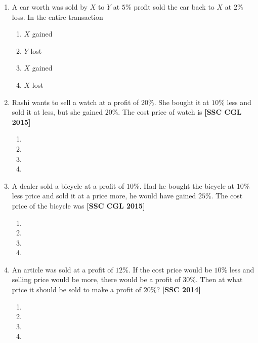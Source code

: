 \documentclass[twocolumn]{article}
\begin{document}
\begin{enumerate}
        \item A car worth  was sold by $X$ to $Y$ at $5 \%$ profit sold the car back to $X$ at $2 \%$ loss. In the entire transaction
            \begin{enumerate}
                \item $X$ gained 
                \item $Y$ lost 
                \item $X$ gained 
                \item $X$ lost 
            \end{enumerate}
            
        \item Rashi wants to sell a watch at a profit of $20 \%$. She bought it at $10 \%$ less and sold it at  less, but she gained $20 \%$. The cost price of watch is \hfill {\bf[SSC CGL 2015]}
            \begin{enumerate}
                \item {}
                \item {}
                \item {}
                \item {}
            \end{enumerate}
            
        \item A dealer sold a bicycle at a profit of $10 \%$. Had he bought the bicycle at $10 \%$ less price and sold it at a price  more, he would have gained $25 \%$. The cost price of the bicycle was \hfill {\bf[SSC CGL 2015]}
            \begin{enumerate}
                \item {}
                \item {}
                \item {}
                \item {}
            \end{enumerate}
            
        \item An article was sold at a profit of $12 \%$. If the cost price would be $10 \%$ less and selling price would be  more, there would be a profit of $30 \%$. Then at what price it should be sold to make a profit of $20 \% $? \hfill {\bf[SSC 2014]}
            \begin{enumerate}
                \item {}
                \item {}
                \item {}
                \item {}
            \end{enumerate}
            

\end{enumerate}
\end{document}
